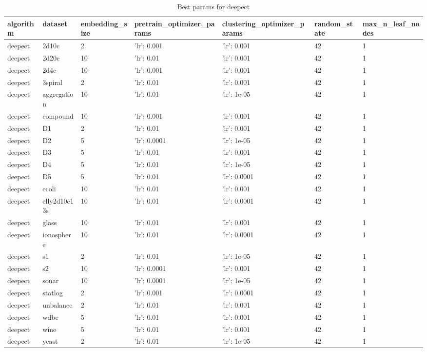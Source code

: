 \clearpage

\begin{table}[H]
\centering
\caption{Best params for deepect}
\label{S16_Table}
\begin{tabular}{|l|l|l|l|l|l|l|}
\hline
algorithm & dataset & embedding\_size & pretrain\_optimizer\_params & clustering\_optimizer\_params & random\_state & max\_n\_leaf\_nodes \\
\hline
deepect & 2d10c & 2 & {'lr': 0.001} & {'lr': 0.001} & 42 & 1 \\
\hline
deepect & 2d20c & 10 & {'lr': 0.01} & {'lr': 0.001} & 42 & 1 \\
\hline
deepect & 2d4c & 10 & {'lr': 0.001} & {'lr': 0.001} & 42 & 1 \\
\hline
deepect & 3spiral & 2 & {'lr': 0.01} & {'lr': 0.001} & 42 & 1 \\
\hline
deepect & aggregation & 10 & {'lr': 0.01} & {'lr': 1e-05} & 42 & 1 \\
\hline
deepect & compound & 10 & {'lr': 0.001} & {'lr': 0.001} & 42 & 1 \\
\hline
deepect & D1 & 2 & {'lr': 0.01} & {'lr': 0.001} & 42 & 1 \\
\hline
deepect & D2 & 5 & {'lr': 0.0001} & {'lr': 1e-05} & 42 & 1 \\
\hline
deepect & D3 & 5 & {'lr': 0.01} & {'lr': 0.001} & 42 & 1 \\
\hline
deepect & D4 & 5 & {'lr': 0.01} & {'lr': 1e-05} & 42 & 1 \\
\hline
deepect & D5 & 5 & {'lr': 0.01} & {'lr': 0.0001} & 42 & 1 \\
\hline
deepect & ecoli & 10 & {'lr': 0.01} & {'lr': 0.001} & 42 & 1 \\
\hline
deepect & elly2d10c13s & 10 & {'lr': 0.01} & {'lr': 0.0001} & 42 & 1 \\
\hline
deepect & glass & 10 & {'lr': 0.01} & {'lr': 0.001} & 42 & 1 \\
\hline
deepect & ionosphere & 10 & {'lr': 0.01} & {'lr': 0.0001} & 42 & 1 \\
\hline
deepect & s1 & 2 & {'lr': 0.01} & {'lr': 1e-05} & 42 & 1 \\
\hline
deepect & s2 & 10 & {'lr': 0.0001} & {'lr': 0.001} & 42 & 1 \\
\hline
deepect & sonar & 10 & {'lr': 0.0001} & {'lr': 1e-05} & 42 & 1 \\
\hline
deepect & statlog & 2 & {'lr': 0.001} & {'lr': 0.0001} & 42 & 1 \\
\hline
deepect & unbalance & 2 & {'lr': 0.01} & {'lr': 0.001} & 42 & 1 \\
\hline
deepect & wdbc & 5 & {'lr': 0.01} & {'lr': 0.001} & 42 & 1 \\
\hline
deepect & wine & 5 & {'lr': 0.01} & {'lr': 0.001} & 42 & 1 \\
\hline
deepect & yeast & 2 & {'lr': 0.01} & {'lr': 1e-05} & 42 & 1 \\
\hline
\end{tabular}
\end{table}


